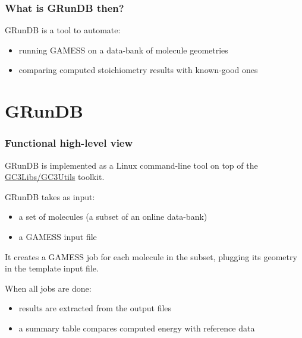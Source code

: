 \documentclass {beamer}
\newcommand{\largeskip}{\vspace{1em}}
\def\+{\largeskip}
\begin{document}

\begin{frame}
  \frametitle{What is GRunDB then?}
  
  GRunDB is a tool to automate:
  \begin{itemize}
  \item running GAMESS on a data-bank of molecule geometries
  \item comparing computed stoichiometry results with known-good ones
  \end{itemize}
\end{frame}

\section{GRunDB}

\begin{frame}
  \frametitle{Functional high-level view}

  GRunDB is implemented as a Linux command-line tool on top of the
  \href{http://gc3pie.googlecode.com/}{GC3Libs/GC3Utils} toolkit.

  \+
  GRunDB takes as input:
  \begin{itemize}
  \item a set of molecules (a subset of an online data-bank)
  \item a GAMESS input file
  \end{itemize}
  It creates a GAMESS job for each molecule in the subset, plugging
  its geometry in the template input file.

  \+
  When all jobs are done:
  \begin{itemize}
  \item results are extracted from the output files
  \item a summary table compares computed energy with reference data
  \end{itemize}

\end{frame}
\end{document}
